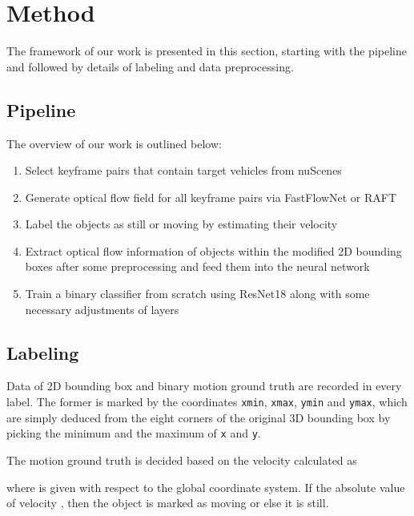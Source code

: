 \documentclass[10pt, a4paper, twocolumn]{article}
\begin{document}
    
\section{\large Method}

    The framework of our work is presented in this section, starting with the pipeline and followed by details of labeling and data preprocessing.

\subsection{\normalsize Pipeline}

    The overview of our work is outlined below:
    
    \begin{enumerate}[noitemsep, topsep=0pt]
        \item Select keyframe pairs that contain target vehicles from nuScenes
        \item Generate optical flow field for all keyframe pairs via FastFlowNet or RAFT
        \item Label the objects as still or moving by estimating their velocity  
        \item Extract optical flow information of objects within the modified 2D bounding boxes after some preprocessing and feed them into the neural network
        \item Train a binary classifier from scratch using ResNet18 along with some necessary adjustments of layers
    \end{enumerate}
    
\subsection{\normalsize Labeling}

    Data of 2D bounding box and binary motion ground truth are recorded in every label. The former is marked by the coordinates \texttt{xmin}, \texttt{xmax}, \texttt{ymin} and \texttt{ymax}, which are simply deduced from the eight corners of the original 3D bounding box by picking the minimum and the maximum of \texttt{x} and \texttt{y}. 
    
    The motion ground truth is decided based on the velocity calculated as
    
    where  is given with respect to the global coordinate system. If the absolute value of velocity , then the object is marked as moving or else it is still.  
\end{document}
